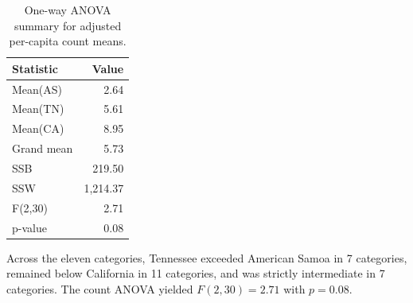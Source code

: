 \begin{table}[H]
  \centering
  \caption{Adjusted per-capita count: Hypothesis test outcomes at $\alpha = 0.05$.}
  \label{tab:anova-count-outcomes}
  \small
\end{table}

\begin{table}[H]
  \centering
  \caption{One-way ANOVA summary for adjusted per-capita count means.}
  \label{tab:anova-count-summary}
  \begin{tabular}{@{}lr@{}}
    \toprule
    Statistic & Value\\
    \midrule
    Mean(AS) & 2.64\\
    Mean(TN) & 5.61\\
    Mean(CA) & 8.95\\
    Grand mean & 5.73\\
    SSB & 219.50\\
    SSW & 1{,}214.37\\
    F(2,30) & 2.71\\
    p-value & 0.08\\
    \bottomrule
  \end{tabular}
\end{table}

Across the eleven categories, Tennessee exceeded American Samoa in 7 categories, remained below California in 11 categories, and was strictly intermediate in 7 categories. The count ANOVA yielded $F(2,30)=2.71$ with $p=0.08$.

